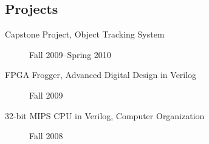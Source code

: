 \documentclass[letterpage]{article}
\begin{document}
\begin{minipage}[t]{0.59\textwidth}
  \subsection*{Projects}
  \vspace{-5pt}
  \begin{description}
  \item[Capstone Project, Object Tracking System] \hfill Fall
    2009--Spring 2010
  \item[FPGA Frogger, Advanced Digital Design in Verilog]\hfill Fall
    2009
  \item[32-bit MIPS CPU in Verilog, Computer Organization]\hfill Fall 2008
  \end{description}

  \vspace{-5pt}

\end{minipage}
\end{document}
